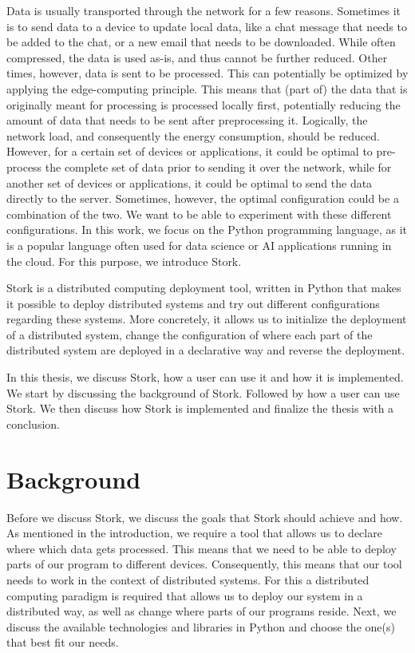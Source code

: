 \documentclass[a4paper]{article}
\begin{document}
Data is usually transported through the network for a few reasons. Sometimes it is to send data to a device to update local data, like a chat message that needs to be added to the chat, or a new email that needs to be downloaded. While often compressed, the data is used as-is, and thus cannot be further reduced. Other times, however, data is sent to be processed. This can potentially be optimized by applying the edge-computing principle. This means that (part of) the data that is originally meant for processing is processed locally first, potentially reducing the amount of data that needs to be sent after preprocessing it. Logically, the network load, and consequently the energy consumption, should be reduced. However, for a certain set of devices or applications, it could be optimal to pre-process the complete set of data prior to sending it over the network, while for another set of devices or applications, it could be optimal to send the data directly to the server. Sometimes, however, the optimal configuration could be a combination of the two. We want to be able to experiment with these different configurations. In this work, we focus on the Python programming language, as it is a popular language often used for data science or AI applications running in the cloud. For this purpose, we introduce Stork.

Stork is a distributed computing deployment tool, written in Python that makes it possible to deploy distributed systems and try out different configurations regarding these systems. More concretely, it allows us to initialize the deployment of a distributed system, change the configuration of where each part of the distributed system are deployed in a declarative way and reverse the deployment.

In this thesis, we discuss Stork, how a user can use it and how it is implemented. We start by discussing the background of Stork. Followed by how a user can use Stork. We then discuss how Stork is implemented and finalize the thesis with a conclusion.
\section{Background}
Before we discuss Stork, we discuss the goals that Stork should achieve and how. As mentioned in the introduction, we require a tool that allows us to declare where which data gets processed. This means that we need to be able to deploy parts of our program to different devices. Consequently, this means that our tool needs to work in the context of distributed systems. For this a distributed computing paradigm is required that allows us to deploy our system in a distributed way, as well as change where parts of our programs reside. Next, we discuss the available technologies and libraries in Python and choose the one(s) that best fit our needs.
\end{document}
